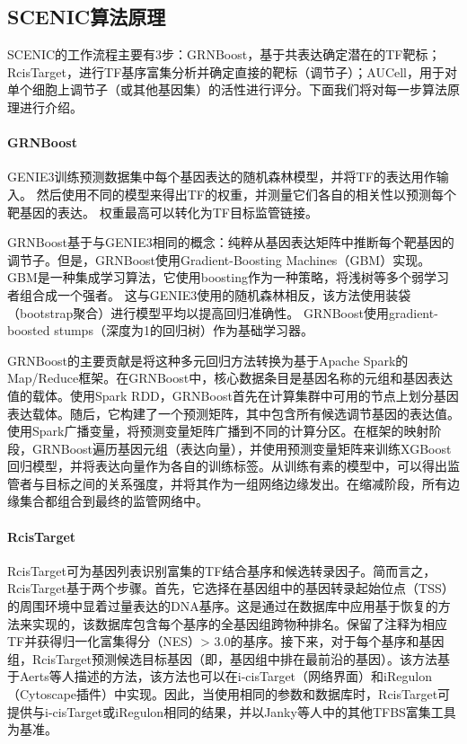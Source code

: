 \subsection{SCENIC算法原理}
  SCENIC的工作流程主要有3步：GRNBoost，基于共表达确定潜在的TF靶标；RcisTarget，进行TF基序富集分析并确定直接的靶标（调节子）；AUCell，用于对单个细胞上调节子（或其他基因集）的活性进行评分。下面我们将对每一步算法原理进行介绍。
\paragraph{GRNBoost}
  GENIE3训练预测数据集中每个基因表达的随机森林模型，并将TF的表达用作输入。 然后使用不同的模型来得出TF的权重，并测量它们各自的相关性以预测每个靶基因的表达。 权重最高可以转化为TF目标监管链接。

  GRNBoost基于与GENIE3相同的概念：纯粹从基因表达矩阵中推断每个靶基因的调节子。但是，GRNBoost使用Gradient-Boosting Machines（GBM）\cite{friedman2001greedy}实现。 GBM是一种集成学习算法，它使用boosting\cite{freund1999short}作为一种策略，将浅树等多个弱学习者组合成一个强者。 这与GENIE3使用的随机森林相反，该方法使用装袋（bootstrap聚合）进行模型平均以提高回归准确性。 GRNBoost使用gradient-boosted stumps（深度为1的回归树）\cite{slawek2013ennet}作为基础学习器。

  GRNBoost的主要贡献是将这种多元回归方法转换为基于Apache Spark\cite{zaharia2012fast}的Map/Reduce\cite{dean2008mapreduce}框架。在GRNBoost中，核心数据条目是基因名称的元组和基因表达值的载体。使用Spark RDD，GRNBoost首先在计算集群中可用的节点上划分基因表达载体。随后，它构建了一个预测矩阵，其中包含所有候选调节基因的表达值。使用Spark广播变量，将预测变量矩阵广播到不同的计算分区。在框架的映射阶段，GRNBoost遍历基因元组（表达向量），并使用预测变量矩阵来训练XGBoost回归模型，并将表达向量作为各自的训练标签。从训练有素的模型中，可以得出监管者与目标之间的关系强度，并将其作为一组网络边缘发出。在缩减阶段，所有边缘集合都组合到最终的监管网络中。
\paragraph{RcisTarget}
  RcisTarget可为基因列表识别富集的TF结合基序和候选转录因子。简而言之，RcisTarget基于两个步骤。首先，它选择在基因组中的基因转录起始位点（TSS）的周围环境中显着过量表达的DNA基序。这是通过在数据库中应用基于恢复的方法来实现的，该数据库包含每个基序的全基因组跨物种排名。保留了注释为相应TF并获得归一化富集得分（NES）> 3.0的基序。接下来，对于每个基序和基因组，RcisTarget预测候选目标基因（即，基因组中排在最前沿的基因）。该方法基于Aerts等人\cite{aerts2010robust}描述的方法，该方法也可以在i-cisTarget（网络界面）\cite{herrmann2012cistarget}和iRegulon（Cytoscape插件）\cite{verfaillie2014iregulon}中实现。因此，当使用相同的参数和数据库时，RcisTarget可提供与i-cisTarget或iRegulon相同的结果，并以Janky等人\cite{verfaillie2014iregulon}中的其他TFBS富集工具为基准。
